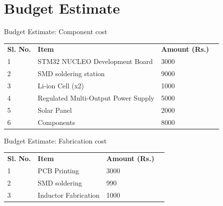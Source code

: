 \documentclass[aspectratio=169]{beamer}
\begin{document}
	\section{Budget Estimate}
	\begin{frame}{Budget Estimate: Component cost}
		
		\begin{table}[]
			\begin{tabular}{|l|l|l|l}
				\cline{1-3}
				\textbf{Sl. No.} & \textbf{Item}                       & \textbf{Amount (Rs.)} &  \\ \cline{1-3}
				1                & STM32 NUCLEO Development Board      & 3000                  &  \\ \cline{1-3}
				2                & SMD soldering station               & 9000                  &  \\ \cline{1-3}
				3                & Li-ion Cell (x2)                  & 1000                  &  \\ \cline{1-3}
				4                & Regulated Multi-Output Power Supply & 5000                  &  \\ \cline{1-3}
				5                & Solar Panel                         & 2000                    &  \\ \cline{1-3}
				6                & Components                          & 8000         &  \\ \cline{1-3}
			\end{tabular}
		\end{table}
		
		
		
	\end{frame}
	
	
	\begin{frame}{Budget Estimate: Fabrication cost}
		\begin{table}[]
			\begin{tabular}{|l|l|l|l}
				\cline{1-3}
				\textbf{Sl. No.} & \textbf{Item}        & \textbf{Amount (Rs.)} &  \\ \cline{1-3}
				1                & PCB Printing         & 3000                    &  \\ \cline{1-3}
				2                & SMD soldering        & 990                    &  \\ \cline{1-3}
				3                & Inductor Fabrication & 1000                  &  \\ \cline{1-3}
			\end{tabular}
		\end{table}
	\end{frame}
	
\end{document}
